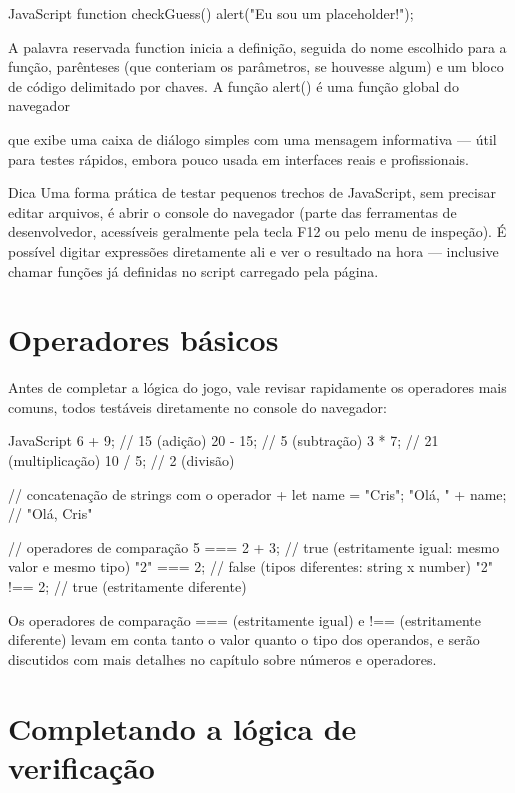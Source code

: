 \begin{codebox}{JavaScript}
 function checkGuess() {
   alert("Eu sou um placeholder!");
 }
\end{codebox}

A palavra reservada function inicia a definição, seguida do nome escolhido para a função, parênteses (que conteriam os parâmetros, se houvesse algum) e um bloco de código delimitado por chaves. A função alert() é uma função global do navegador

que exibe uma caixa de diálogo simples com uma mensagem informativa — útil para testes rápidos, embora pouco usada em interfaces reais e profissionais.

\begin{infobox}{Dica}
Uma forma prática de testar pequenos trechos de JavaScript, sem precisar editar arquivos, é abrir o console do navegador (parte das ferramentas de desenvolvedor, acessíveis geralmente pela tecla F12 ou pelo menu de inspeção). É possível digitar expressões diretamente ali e ver o resultado na hora — inclusive chamar funções já definidas no script carregado pela página.
\end{infobox}

\section{Operadores básicos}

Antes de completar a lógica do jogo, vale revisar rapidamente os operadores mais comuns, todos testáveis diretamente no console do navegador:

\begin{codebox}{JavaScript}
6 + 9;       // 15   (adição)
20 - 15;     // 5    (subtração)
3 * 7;       // 21   (multiplicação)
10 / 5;      // 2    (divisão)

// concatenação de strings com o operador +
let name = "Cris";
"Olá, " + name;    // "Olá, Cris"

// operadores de comparação
5 === 2 + 3;   // true (estritamente igual: mesmo valor e mesmo tipo)
"2" === 2;     // false (tipos diferentes: string x number)
"2" !== 2;     // true (estritamente diferente)
\end{codebox}

Os operadores de comparação === (estritamente igual) e !== (estritamente diferente) levam em conta tanto o valor quanto o tipo dos operandos, e serão discutidos com mais detalhes no capítulo sobre números e operadores.

\section{Completando a lógica de verificação}

